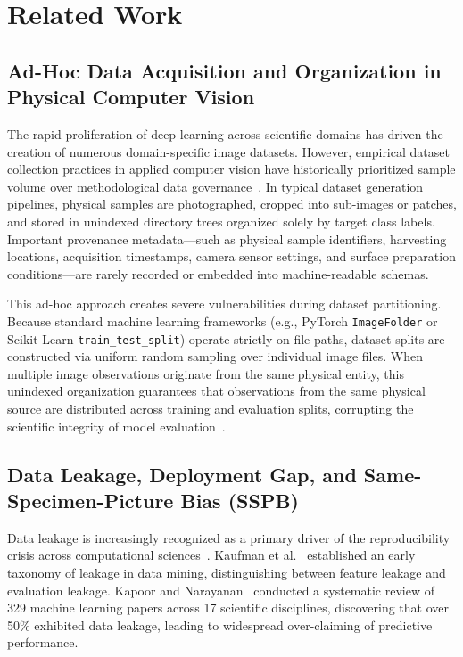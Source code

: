 \section{Related Work}

\subsection{Ad-Hoc Data Acquisition and Organization in Physical Computer Vision}
The rapid proliferation of deep learning across scientific domains has driven the creation of numerous domain-specific image datasets. However, empirical dataset collection practices in applied computer vision have historically prioritized sample volume over methodological data governance~\cite{varoquaux2022}. In typical dataset generation pipelines, physical samples are photographed, cropped into sub-images or patches, and stored in unindexed directory trees organized solely by target class labels. Important provenance metadata---such as physical sample identifiers, harvesting locations, acquisition timestamps, camera sensor settings, and surface preparation conditions---are rarely recorded or embedded into machine-readable schemas.

This ad-hoc approach creates severe vulnerabilities during dataset partitioning. Because standard machine learning frameworks (e.g., PyTorch \texttt{ImageFolder} or Scikit-Learn \texttt{train\_test\_split}) operate strictly on file paths, dataset splits are constructed via uniform random sampling over individual image files. When multiple image observations originate from the same physical entity, this unindexed organization guarantees that observations from the same physical source are distributed across training and evaluation splits, corrupting the scientific integrity of model evaluation~\cite{kapoor2023}.

\subsection{Data Leakage, Deployment Gap, and Same-Specimen-Picture Bias (SSPB)}
Data leakage is increasingly recognized as a primary driver of the reproducibility crisis across computational sciences~\cite{kapoor2023,kaufman2012}. Kaufman et al.~\cite{kaufman2012} established an early taxonomy of leakage in data mining, distinguishing between feature leakage and evaluation leakage. Kapoor and Narayanan~\cite{kapoor2023} conducted a systematic review of 329 machine learning papers across 17 scientific disciplines, discovering that over 50\% exhibited data leakage, leading to widespread over-claiming of predictive performance.

